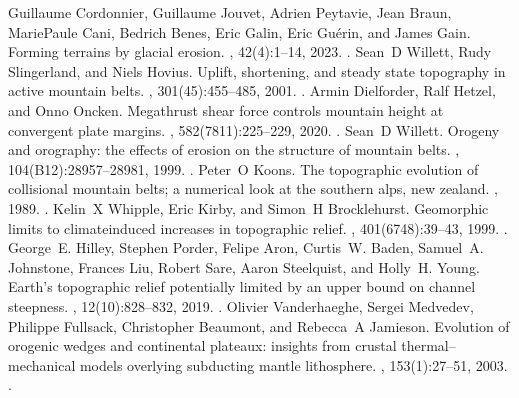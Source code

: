 \documentclass[letterpaper,10pt,english]{jupyterBook}
\begin{document}
\begin{sphinxthebibliography}{10}
\sphinxAtStartPar
Guillaume Cordonnier, Guillaume Jouvet, Adrien Peytavie, Jean Braun, Marie\sphinxhyphen{}Paule Cani, Bedrich Benes, Eric Galin, Eric Guérin, and James Gain. Forming terrains by glacial erosion. , 42(4):1–14, 2023. .
\sphinxAtStartPar
Sean D Willett, Rudy Slingerland, and Niels Hovius. Uplift, shortening, and steady state topography in active mountain belts. , 301(4\sphinxhyphen{}5):455–485, 2001. .
\sphinxAtStartPar
Armin Dielforder, Ralf Hetzel, and Onno Oncken. Megathrust shear force controls mountain height at convergent plate margins. , 582(7811):225–229, 2020. .
\sphinxAtStartPar
Sean D Willett. Orogeny and orography: the effects of erosion on the structure of mountain belts. , 104(B12):28957–28981, 1999. .
\sphinxAtStartPar
Peter O Koons. The topographic evolution of collisional mountain belts; a numerical look at the southern alps, new zealand. , 1989. .
\sphinxAtStartPar
Kelin X Whipple, Eric Kirby, and Simon H Brocklehurst. Geomorphic limits to climate\sphinxhyphen{}induced increases in topographic relief. , 401(6748):39–43, 1999. .
\sphinxAtStartPar
George E. Hilley, Stephen Porder, Felipe Aron, Curtis W. Baden, Samuel A. Johnstone, Frances Liu, Robert Sare, Aaron Steelquist, and Holly H. Young. Earth’s topographic relief potentially limited by an upper bound on channel steepness. , 12(10):828–832, 2019. .
\sphinxAtStartPar
Olivier Vanderhaeghe, Sergei Medvedev, Philippe Fullsack, Christopher Beaumont, and Rebecca A Jamieson. Evolution of orogenic wedges and continental plateaux: insights from crustal thermal–mechanical models overlying subducting mantle lithosphere. , 153(1):27–51, 2003. .

\end{sphinxthebibliography}
\end{document}
